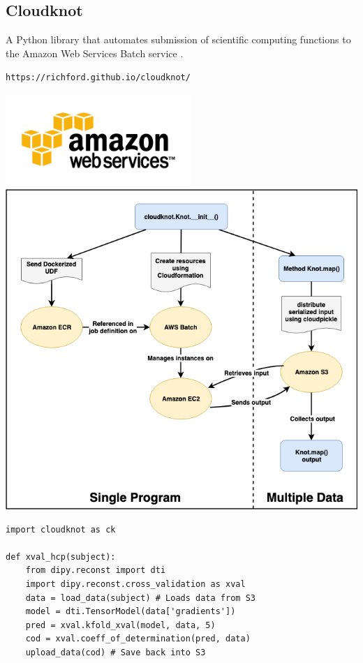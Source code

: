 \documentclass[a0, landscape]{a0poster}
\begin{document}
\begin{multicols}{3}
\subsection*{Cloudknot}

A Python library that automates submission of scientific computing functions
to the Amazon Web Services Batch service \cite{adam_richie-halford-proc-scipy-2018}.

\texttt{https://richford.github.io/cloudknot/}

\begin{minipage}[b]{1\linewidth}
\begin{minipage}[b]{0.45\linewidth}
  \includegraphics[height=3.5cm]{AWS.png}\\
  \includegraphics[width=14cm]{ck-architecture.png}
\end{minipage}
\begin{minipage}[b]{0.55\linewidth}
\begin{lstlisting}
import cloudknot as ck

def xval_hcp(subject):
	from dipy.reconst import dti
    import dipy.reconst.cross_validation as xval
	data = load_data(subject) # Loads data from S3
	model = dti.TensorModel(data['gradients'])
    pred = xval.kfold_xval(model, data, 5)
    cod = xval.coeff_of_determination(pred, data)
    upload_data(cod) # Save back into S3


\end{lstlisting}
\end{minipage}
\end{minipage}
\end{multicols}
\end{document}
